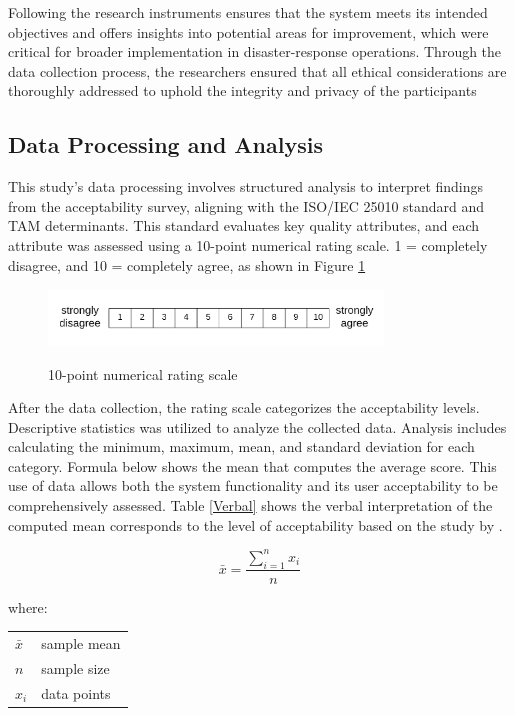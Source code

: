 	Following the research instruments ensures that the system meets its intended objectives and offers insights into potential areas for improvement, which were critical for broader implementation in disaster-response operations. Through the data collection process, the researchers ensured that all ethical considerations are thoroughly addressed to uphold the integrity and privacy of the participants

\subsection{Data Processing and Analysis}
	This study's data processing involves structured analysis to interpret findings from the acceptability survey, aligning with the ISO/IEC 25010 standard and TAM determinants. This standard evaluates key quality attributes, and each attribute was assessed using a 10-point numerical rating scale. 1 = completely disagree, and 10 = completely agree, as shown in Figure \ref{Nrs}
	
	\begin{figure}[h!]
		\caption{10-point numerical rating scale}
		\centering
		\includegraphics[width=3.5in]{Nrs-10}
		\label{Nrs}
	\end{figure}
	
	After the data collection, the rating scale categorizes the acceptability levels. Descriptive statistics was utilized to analyze the collected data. Analysis includes calculating the minimum, maximum, mean, and standard deviation for each category. Formula below shows the mean that computes the average score. This use of data allows both the system functionality and its user acceptability to be comprehensively assessed. Table \ref{Verbal} shows the verbal interpretation of the computed mean corresponds to the level of acceptability based on the study by \textcite{Eladia2024}. 
	
	
	\begin{equation*} 
		\label{mean}
		\bar{x} = \frac{\sum_{i=1}^{n} x_{i}}{n}
	\end{equation*}
	
	\noindent where: \\
	\begin{tabular}{@{}ll}
	$\bar{x}$ & sample mean \\
	$n$ & sample size \\
	$x_{i}$ & data points \\
	\end{tabular}
	
